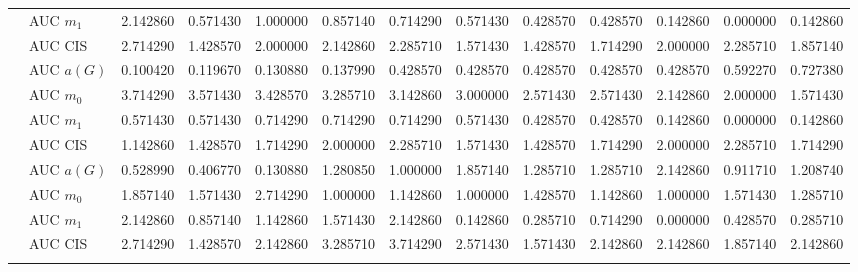 \begin{table}[htbp]
\begin{tabular}{llrrrrrrrrrrr}
    & AUC $m_1$ & 2.142860 & 0.571430 & 1.000000 & 0.857140 & 0.714290 & 0.571430 & 0.428570 & 0.428570 & 0.142860 & 0.000000 & 0.142860 \\
    & AUC CIS & 2.714290 & 1.428570 & 2.000000 & 2.142860 & 2.285710 & 1.571430 & 1.428570 & 1.714290 & 2.000000 & 2.285710 & 1.857140 \\
    \addlinespace
    \multirow{4}{*}{degree} & AUC $a(G)$ & 0.100420 & 0.119670 & 0.130880 & 0.137990 & 0.428570 & 0.428570 & 0.428570 & 0.428570 & 0.428570 & 0.592270 & 0.727380 \\
    & AUC $m_0$ & 3.714290 & 3.571430 & 3.428570 & 3.285710 & 3.142860 & 3.000000 & 2.571430 & 2.571430 & 2.142860 & 2.000000 & 1.571430 \\
    & AUC $m_1$ & 0.571430 & 0.571430 & 0.714290 & 0.714290 & 0.714290 & 0.571430 & 0.428570 & 0.428570 & 0.142860 & 0.000000 & 0.142860 \\
    & AUC CIS & 1.142860 & 1.428570 & 1.714290 & 2.000000 & 2.285710 & 1.571430 & 1.428570 & 1.714290 & 2.000000 & 2.285710 & 1.714290 \\
    \addlinespace
    \multirow{4}{*}{random} & AUC $a(G)$ & 0.528990 & 0.406770 & 0.130880 & 1.280850 & 1.000000 & 1.857140 & 1.285710 & 1.285710 & 2.142860 & 0.911710 & 1.208740 \\
    & AUC $m_0$ & 1.857140 & 1.571430 & 2.714290 & 1.000000 & 1.142860 & 1.000000 & 1.428570 & 1.142860 & 1.000000 & 1.571430 & 1.285710 \\
    & AUC $m_1$ & 2.142860 & 0.857140 & 1.142860 & 1.571430 & 2.142860 & 0.142860 & 0.285710 & 0.714290 & 0.000000 & 0.428570 & 0.285710 \\
    & AUC CIS & 2.714290 & 1.428570 & 2.142860 & 3.285710 & 3.714290 & 2.571430 & 1.571430 & 2.142860 & 2.142860 & 1.857140 & 2.142860 \\
    \addlinespace
    \bottomrule
  \end{tabular}
\end{table}

